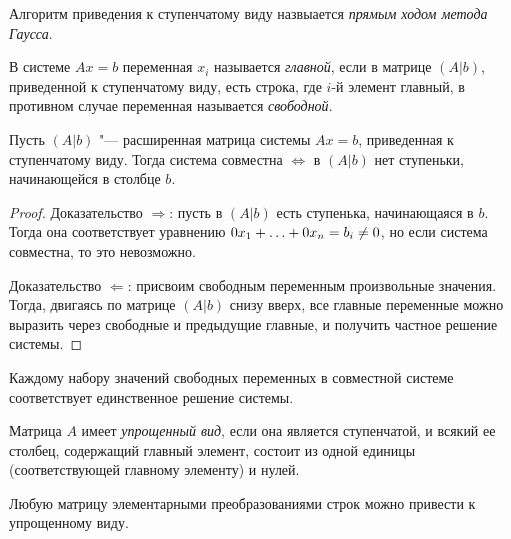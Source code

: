 \begin{definition}
	Алгоритм приведения к ступенчатому виду назвыается \textit{прямым ходом метода Гаусса}.
\end{definition}

\begin{definition}
	В системе $Ax = b$ переменная $x_i$ называется \textit{главной}, если в матрице $(A|b)$, приведенной к ступенчатому виду, есть строка, где $i$-й элемент главный, в противном случае переменная называется \textit{свободной}.
\end{definition}

\begin{theorem}
	Пусть $(A|b)$ "--- расширенная матрица системы $Ax = b$, приведенная к ступенчатому виду. Тогда система совместна $\Leftrightarrow$ в $(A|b)$ нет ступеньки, начинающейся в  столбце $b$.
\end{theorem}

\begin{proof}
	Доказательство $\Rightarrow$: пусть в $(A|b)$ есть ступенька, начинающаяся в $b$. Тогда она соответствует уравнению $0x_1 + \dots \hm{+} 0x_n = b_i \ne 0$, но если система совместна, то это невозможно.
	
	Доказательство $\Leftarrow$: присвоим свободным переменным произвольные значения. Тогда, двигаясь по матрице $(A|b)$ снизу вверх, все главные переменные можно выразить через свободные и предыдущие главные, и получить частное решение системы.
\end{proof}

\begin{note}
	Каждому набору значений свободных переменных в совместной системе соответствует единственное решение системы.
\end{note}

\begin{definition}
	Матрица $A$ имеет \textit{упрощенный вид}, если она является ступенчатой, и всякий ее столбец, содержащий главный элемент, состоит из одной единицы (соответствующей главному элементу) и нулей.
\end{definition}

\begin{theorem}
	Любую матрицу элементарными преобразованиями строк можно привести к упрощенному виду.
\end{theorem}

